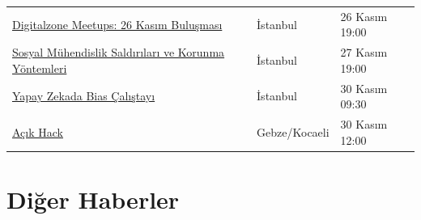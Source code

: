 \documentclass[11pt]{article}
\begin{document}
\begin{longtable}{|p{8cm}|l|l|}
\href{https://kommunity.com/digitalzone-meetups-aylik-seo-kafe-toplantilari/events/digitalzone-meetups-26-kasim-bulusmasi}{Digitalzone Meetups: 26 Kasım Buluşması} & İstanbul & 26 Kasım 19:00\\
\href{https://www.eventbrite.com/e/sosyal-muhendislik-saldrlar-ve-korunma-yontemleri-hacknightsorg-tickets-77644170805}{Sosyal Mühendislik Saldırıları ve Korunma Yöntemleri} & İstanbul & 27 Kasım 19:00\\
\href{https://www.eventbrite.com/e/yapay-zekada-bias-calstay-registration-79316901989}{Yapay Zekada Bias Çalıştayı} & İstanbul & 30 Kasım 09:30\\
\href{https://www.acikhack.com/}{Açık Hack} & Gebze/Kocaeli & 30 Kasım 12:00\\
\hline
\end{longtable}
\section{Diğer Haberler}
\label{sec:orged48157}
\end{document}
